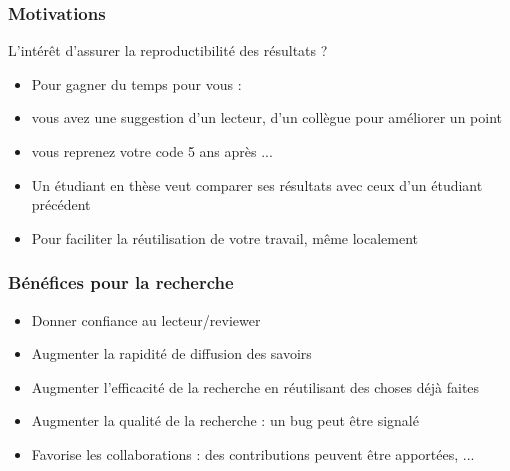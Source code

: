 \begin{frame}
\frametitle{Motivations}


\begin{block}{L'intérêt d'assurer la reproductibilité des résultats ?}
\begin{itemize}
\item Pour gagner du temps \textcolor{maincolor}{pour vous} : \\
\end{itemize}


  \begin{itemize}
\item[\ding{220}] vous avez une suggestion d'un lecteur, d'un collègue pour améliorer un point
  \item[\ding{220}] vous reprenez votre code 5 ans après ...
  \item[\ding{220}] Un étudiant en thèse veut comparer ses résultats avec ceux d'un étudiant précédent \\  
  \end{itemize}

 \begin{itemize}
\item Pour faciliter la réutilisation de votre travail, même localement \\   
\end{itemize}
 
\end{block}

\end{frame}



\begin{frame}
\frametitle{Bénéfices pour la recherche}


\begin{itemize}
\item Donner confiance au lecteur/reviewer \\  
\item Augmenter la rapidité de diffusion des savoirs
\item Augmenter l'efficacité de la recherche en réutilisant des choses déjà faites
\item Augmenter la qualité de la recherche : un bug peut être signalé
\item Favorise les collaborations : des contributions peuvent être apportées, ...\\
\end{itemize}
~\\

\end{frame}



